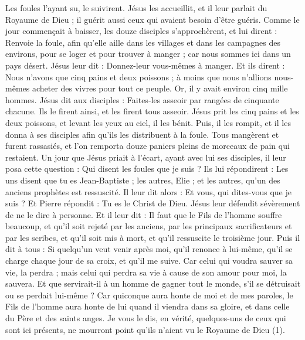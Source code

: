 \begin{multicols}{2}
Les foules l’ayant su, le suivirent. Jésus les accueillit, et il leur parlait du Royaume de Dieu ; il guérit aussi ceux qui avaient besoin d'être guéris.
Comme le jour commençait à baisser, les douze disciples s’approchèrent, et lui dirent : Renvoie la foule, afin qu’elle aille dans les villages et dans les campagnes des environs, pour se loger et pour trouver à manger ; car nous sommes ici dans un pays désert.
Jésus leur dit : Donnez-leur vous-mêmes à manger. Et ils dirent : Nous n'avons que cinq pains et deux poissons ; à moins que nous n'allions nous-mêmes acheter des vivres pour tout ce peuple.
Or, il y avait environ cinq mille hommes. Jésus dit aux disciples : Faites-les asseoir par rangées de cinquante chacune.
Ils le firent ainsi, et les firent tous asseoir.
Jésus prit les cinq pains et les deux poissons, et levant les yeux au ciel, il les bénit. Puis, il les rompit, et il les donna à ses disciples afin qu'ils les distribuent à la foule.
Tous mangèrent et furent rassasiés, et l’on remporta douze paniers pleins de morceaux de pain qui restaient.
Un jour que Jésus priait à l'écart, ayant avec lui ses disciples, il leur posa cette question : Qui disent les foules que je suis ?
Ils lui répondirent : Les uns disent que tu es Jean-Baptiste ; les autres, Elie ; et les autres, qu’un des anciens prophètes est ressuscité.
Il leur dit alors : Et vous, qui dites-vous que je suis ? Et Pierre répondit : Tu es le Christ de Dieu.
Jésus leur défendit sévèrement de ne le dire à personne.
Et il leur dit : Il faut que le Fils de l'homme souffre beaucoup, et qu'il soit rejeté par les anciens, par les principaux sacrificateurs et par les scribes, et qu'il soit mis à mort, et qu'il ressuscite le troisième jour.
Puis il dit à tous : Si quelqu'un veut venir après moi, qu'il renonce à lui-même, qu'il se charge chaque jour de sa croix, et qu’il me suive.
Car celui qui voudra sauver sa vie, la perdra ; mais celui qui perdra sa vie à cause de son amour pour moi, la sauvera.
Et que servirait-il à un homme de gagner tout le monde, s'il se détruisait ou se perdait lui-même ?
Car quiconque aura honte de moi et de mes paroles, le Fils de l'homme aura honte de lui quand il viendra dans sa gloire, et dans celle du Père et des saints anges.
\TextTitle{[La transfiguration]}
Je vous le dis, en vérité, quelques-uns de ceux qui sont ici présents, ne mourront point qu’ils n’aient vu le Royaume de Dieu (1).

\end{multicols}
